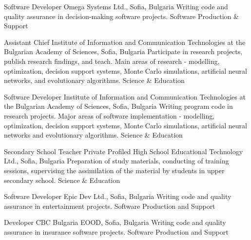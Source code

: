 \documentclass[english,a4paper]{europasscv}
\begin{document}
  \begin{europasscv}

  \ecvpersonalinfo


  
   {Software Developer}
  \ecvitem {} {Omega Systems Ltd., Sofia, Bulgaria}
  \ecvitem {} {Writing code and quality assurance in decision-making software projects.}
  \ecvitem {} { \quad Software Production \& Support}
  
   {Assistant Chief}
  \ecvitem {} {Institute of Information and Communication Technologies at the Bulgarian Academy of Sciences, Sofia, Bulgaria}
  \ecvitem {} {Participate in research projects, publish research findings, and teach. Main areas of research - modelling, optimization, decision support systems, Monte Carlo simulations, artificial neural networks, and evolutionary algorithms.}
  \ecvitem {} { \quad Science \& Education}
  
   {Software Developer}
  \ecvitem {} {Institute of Information and Communication Technologies at the Bulgarian Academy of Sciences, Sofia, Bulgaria}
  \ecvitem {} {Writing program code in research projects. Major areas of software implementation - modelling, optimization, decision support systems, Monte Carlo simulations, artificial neural networks and evolutionary algorithms.}
  \ecvitem {} { \quad Science \& Education}
  
   {Secondary School Teacher}
  \ecvitem {} {Private Profiled High School Educational Technology Ltd., Sofia, Bulgaria}
  \ecvitem {} {Preparation of study materials, conducting of training sessions, supervising the assimilation of the material by students in upper secondary school.}
  \ecvitem {} { \quad Science \& Education}
  
   {Software Developer}
  \ecvitem {} {Epic Dev Ltd., Sofia, Bulgaria}
  \ecvitem {} {Writing code and quality assurance in entertainment projects.}
  \ecvitem {} { \quad Software Production and Support}
  
   {Developer}
  \ecvitem {} {CBC Bulgaria EOOD, Sofia, Bulgaria}
  \ecvitem {} {Writing code and quality assurance in insurance software projects.}
  \ecvitem {} { \quad Software Production and Support}
  

\end{europasscv}
\end{document}
